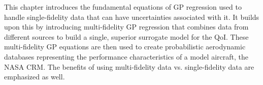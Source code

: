 This chapter introduces the fundamental equations of GP regression used to handle single-fidelity data that can have uncertainties associated with it.
It builds upon this by introducing multi-fidelity GP regression that combines data from different sources to build a single, superior surrogate model for the QoI.
These multi-fidelity GP equations are then used to create probabilistic aerodynamic databases representing the performance characteristics of a model aircraft, the NASA CRM. 
The benefits of using multi-fidelity data vs. single-fidelity data are emphasized as well.